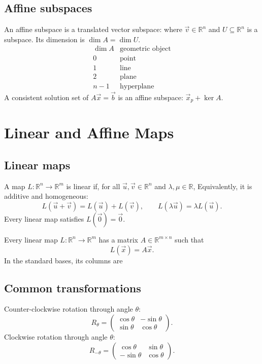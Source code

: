 \documentclass{article}
\begin{document}
\subsection{Affine subspaces}
An affine subspace is a translated vector subspace:
where $\vec{v}\in\mathbb{R}^n$ and $U\subseteq\mathbb{R}^n$ is a
subspace. Its dimension is $\dim A=\dim U$.
\[
    \begin{array}{c|c}
        \dim A&\text{geometric object}\\ \hline
        0&\text{point}\\
        1&\text{line}\\
        2&\text{plane}\\
        n-1&\text{hyperplane}
    \end{array}
\]
A consistent solution set of $A\vec{x}=\vec{b}$ is an affine subspace:
$\vec{x}_p+\ker A$.

\section{Linear and Affine Maps}

\subsection{Linear maps}
A map $L:\mathbb{R}^n\to\mathbb{R}^m$ is linear if, for all
$\vec{u},\vec{v}\in\mathbb{R}^n$ and $\lambda,\mu\in\mathbb{R}$,
Equivalently, it is additive and homogeneous:
\[
    L(\vec{u}+\vec{v})=L(\vec{u})+L(\vec{v}),\qquad
    L(\lambda\vec{u})=\lambda L(\vec{u}).
\]
Every linear map satisfies $L(\vec{0})=\vec{0}$.

Every linear map $L:\mathbb{R}^n\to\mathbb{R}^m$ has a matrix
$A\in\mathbb{R}^{m\times n}$ such that
\[
    L(\vec{x})=A\vec{x}.
\]
In the standard bases, its columns are

\subsection{Common transformations}
Counter-clockwise rotation through angle $\theta$:
\[
    R_\theta=
    \begin{pmatrix}
        \cos\theta&-\sin\theta\\
        \sin\theta&\cos\theta
    \end{pmatrix}.
\]
Clockwise rotation through angle $\theta$:
\[
    R_{-\theta}=
    \begin{pmatrix}
        \cos\theta&\sin\theta\\
        -\sin\theta&\cos\theta
    \end{pmatrix}.
\]
\end{document}
